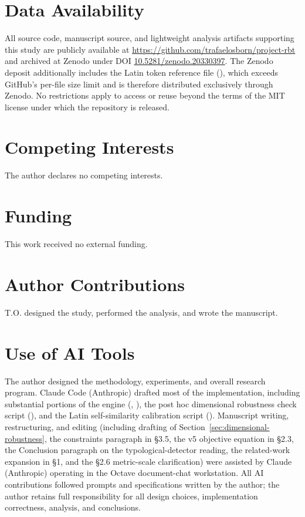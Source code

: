\documentclass[11pt]{article}
\begin{document}
\section*{Data Availability}

All source code, manuscript source, and lightweight analysis artifacts
supporting this study are publicly available at
\url{https://github.com/trafaelosborn/project-rbt} and archived at Zenodo
under DOI \href{https://doi.org/10.5281/zenodo.20330397}{10.5281/zenodo.20330397}.
The Zenodo deposit additionally includes the Latin token reference file
(), which exceeds GitHub's
per-file size limit and is therefore distributed exclusively through Zenodo.
No restrictions apply to access or reuse beyond the terms of the MIT
license under which the repository is released.

\section*{Competing Interests}

The author declares no competing interests.

\section*{Funding}

This work received no external funding.

\section*{Author Contributions}

T.O. designed the study, performed the analysis, and wrote the manuscript.

\section*{Use of AI Tools}

The author designed the methodology, experiments, and overall research
program. Claude Code (Anthropic) drafted most of the implementation,
including substantial portions of the engine
(, ), the
post hoc dimensional robustness check script
(), and the Latin
self-similarity calibration script
(). Manuscript writing,
restructuring, and editing (including drafting of
Section~\ref{sec:dimensional-robustness}, the constraints paragraph in
\S3.5, the v5 objective equation in \S2.3, the Conclusion paragraph on
the typological-detector reading, the related-work expansion in \S1,
and the \S2.6 metric-scale clarification) were assisted by Claude
(Anthropic) operating in the Octave document-chat workstation. All AI
contributions followed prompts and specifications written by the author;
the author retains full responsibility for all design choices,
implementation correctness, analysis, and conclusions.



\end{document}
